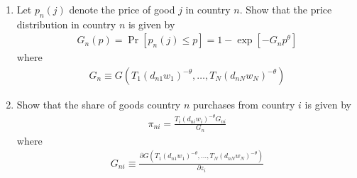\documentclass{article}
\begin{document}
\begin{enumerate}
    \item Let $p_n(j)$ denote the price of good $j$ in country $n$. Show that the price distribution in country $n$ is given by
    \begin{align*}
        G_n(p)=\operatorname{Pr}\left[p_n(j) \leq p\right]=1-\exp \left[-G_n p^\theta\right]
    \end{align*}
    where
    \begin{align*}
        G_n \equiv G\left(T_1\left(d_{n 1} w_1\right)^{-\theta}, \ldots, T_N\left(d_{n N} w_N\right)^{-\theta}\right)
    \end{align*}
    \item Show that the share of goods country $n$ purchases from country $i$ is given by
    \begin{align*}
        \pi_{n i}=\frac{T_i\left(d_{n i} w_i\right)^{-\theta} G_{n i}}{G_n}
    \end{align*}
    where
    \begin{align*}
        G_{n i} \equiv \frac{\partial G\left(T_1\left(d_{n 1} w_1\right)^{-\theta}, \ldots, T_N\left(d_{n N} w_N\right)^{-\theta}\right)}{\partial z_i}
    \end{align*}
\end{enumerate}
\end{document}
